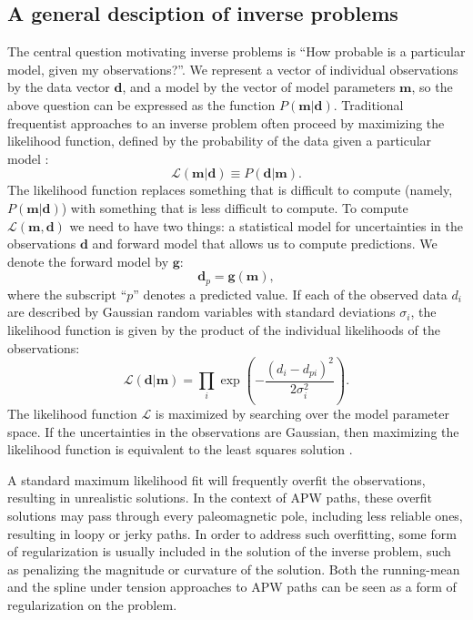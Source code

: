 \documentclass[preprint,12pt,authoryear]{elsarticle}
\begin{document}
\subsection{A general desciption of inverse problems}
\label{sec:intro_inverse_problems}
The central question motivating inverse problems is ``How probable is a particular model, given my observations?''.
We represent a vector of individual observations by the data vector $\mathbf{d}$, and a model
by the vector of model parameters $\mathbf{m}$, so the above question can be expressed as the function $P(\mathbf{m} \vert \mathbf{d})$.
Traditional frequentist approaches to an inverse problem often proceed by maximizing the likelihood function,
defined by the probability of the data given a particular model \citep[e.g][]{aster2005parameter}:
\begin{equation}
\mathcal{L} ( \mathbf{m} \vert \mathbf{d} ) \equiv P( \mathbf{d} \vert \mathbf{m} ).
\label{eq:likelihood}
\end{equation}
The likelihood function replaces something that is difficult to compute (namely, $P(\mathbf{m} \vert \mathbf{d})$)
with something that is less difficult to compute. 
To compute $\mathcal{L}(\mathbf{m}, \mathbf{d})$ we need to have two things: a statistical model for 
uncertainties in the observations $\mathbf{d}$ and forward model that allows us to compute
predictions. We denote the forward model by $\mathbf{g}$:
\begin{equation}
\mathbf{d}_p = \mathbf{g}(\mathbf{m}),
\label{eq:forward}
\end{equation}
where the subscript ``$p$'' denotes a predicted value.
If each of the observed data $d_i$ are described by Gaussian random variables
with standard deviations $\sigma_i$, the likelihood function is given by the product
of the individual likelihoods of the observations:
\begin{equation}
\mathcal{L}(\mathbf{d} | \mathbf{m} ) = \displaystyle\prod_i \exp\left({-\frac{(d_i - d_{pi})^2}{2 \sigma_i^2}}\right).
\label{eq:example_likelihood}
\end{equation}
The likelihood function $\mathcal{L}$ is maximized by searching over the model parameter space.
If the uncertainties in the observations are Gaussian, then maximizing the likelihood function is
equivalent to the least squares solution \citep{aster2005parameter}.

A standard maximum likelihood fit will frequently overfit the observations, resulting
in unrealistic solutions. In the context of APW paths, these overfit solutions may
pass through every paleomagnetic pole, including less reliable ones, resulting in
loopy or jerky paths. In order to address such overfitting, some form of regularization is usually
included in the solution of the inverse problem, such as penalizing the magnitude or
curvature of the solution. Both the running-mean and the spline under tension approaches
to APW paths can be seen as a form of regularization on the problem.
\end{document}

